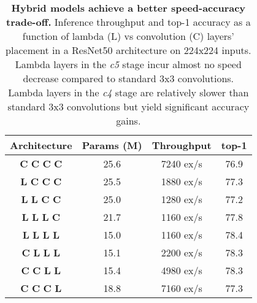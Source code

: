 \documentclass{article} \usepackage{iclr2021_conference,times}
\begin{document}
\begin{table}[h]
  \begin{center}
  \small
  \begin{tabular}{cccc}
    \toprule
    Architecture & Params (M) & Throughput & top-1 \\
    \midrule
    \textbf{C}  \textbf{C}  \textbf{C}  \textbf{C} & 25.6 & 7240 ex/s & 76.9 \\
    \textbf{L}  \textbf{C}  \textbf{C}  \textbf{C} & 25.5 & 1880 ex/s & 77.3 \\
    \textbf{L}  \textbf{L}  \textbf{C}  \textbf{C} & 25.0 & 1280 ex/s & 77.2 \\
    \textbf{L}  \textbf{L}  \textbf{L}  \textbf{C} & 21.7 & 1160 ex/s & 77.8 \\
    \midrule
    \textbf{L}  \textbf{L}  \textbf{L}  \textbf{L} & 15.0 & 1160 ex/s & 78.4 \\
    \textbf{C}  \textbf{L}  \textbf{L}  \textbf{L} & 15.1 & 2200 ex/s & 78.3 \\
    \textbf{C}  \textbf{C}  \textbf{L}  \textbf{L} & 15.4 & 4980 ex/s & 78.3 \\
    \textbf{C}  \textbf{C}  \textbf{C}  \textbf{L} & 18.8 & 7160 ex/s & 77.3 \\
    \bottomrule
  \end{tabular}
  \caption{
  \textbf{Hybrid models achieve a better speed-accuracy trade-off.} 
  Inference throughput and top-1 accuracy as a function of lambda (L) vs convolution (C) layers' placement in a ResNet50 architecture on 224x224 inputs.
  Lambda layers in the \emph{c5} stage incur almost no speed decrease compared to standard 3x3 convolutions.
  Lambda layers in the \emph{c4} stage are relatively slower than standard 3x3 convolutions but yield significant accuracy gains.
  }
  \label{tab:hybrid_lambdanetworks}
\end{center}
\end{table}
\end{document}
